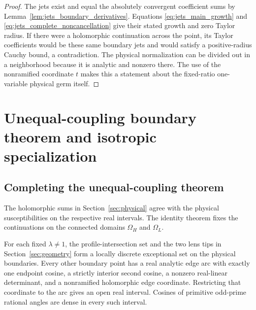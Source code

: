 \documentclass[11pt]{article}
\numberwithin{equation}{section}
\theoremstyle{definition}
\newcommand{\OH}{\Omega_H}
\newcommand{\OL}{\Omega_L}
\begin{document}
\begin{proof}
The jets exist and equal the absolutely convergent coefficient
sums by Lemma~\ref{lem:jets_boundary_derivatives}. Equations
\eqref{eq:jets_main_growth} and
\eqref{eq:jets_complete_noncancellation} give their stated
growth and zero Taylor radius. If there were a holomorphic
continuation across the point, its Taylor coefficients would be
these same boundary jets and would satisfy a positive-radius
Cauchy bound, a contradiction. The physical normalization can
be divided out in a neighborhood because it is analytic and
nonzero there. The use of the nonramified coordinate $t$ makes
this a statement about the fixed-ratio one-variable physical
germ itself.
\end{proof}




\section{Unequal-coupling boundary theorem and isotropic specialization}\label{sec:closure}

\subsection{Completing the unequal-coupling theorem}
The holomorphic sums in Section~\ref{sec:physical} agree with the
physical susceptibilities on the respective real intervals. The
identity theorem fixes the continuations on the connected domains
$\OH$ and $\OL$.

For each fixed $\lambda\ne1$, the profile-intersection set and the
two lens tips in Section~\ref{sec:geometry} form a locally discrete
exceptional set on the physical boundaries. Every other boundary
point has a real analytic edge arc with exactly one endpoint cosine,
a strictly interior second cosine, a nonzero real-linear determinant,
and a nonramified holomorphic edge coordinate. Restricting that
coordinate to the arc gives an open real interval. Cosines of primitive
odd-prime rational angles are dense in every such interval.
\end{document}
